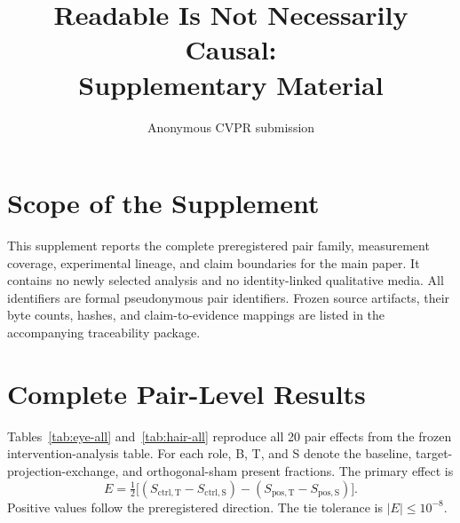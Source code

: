\documentclass[10pt,twocolumn,letterpaper]{article}
\title{Readable Is Not Necessarily Causal:\\Supplementary Material}
\author{Anonymous CVPR submission}
\begin{document}
\maketitle

\section{Scope of the Supplement}

This supplement reports the complete preregistered pair family, measurement
coverage, experimental lineage, and claim boundaries for the main paper.  It
contains no newly selected analysis and no identity-linked qualitative media.
All identifiers are formal pseudonymous pair identifiers.  Frozen source
artifacts, their byte counts, hashes, and claim-to-evidence mappings are listed
in the accompanying traceability package.

\section{Complete Pair-Level Results}

Tables~\ref{tab:eye-all} and~\ref{tab:hair-all} reproduce all 20 pair effects
from the frozen intervention-analysis table.  For each role, B, T, and S denote
the baseline, target-projection-exchange, and orthogonal-sham present fractions.
The primary effect is
\begin{equation}
 E=\tfrac{1}{2}\big[(S_{\mathrm{ctrl,T}}-S_{\mathrm{ctrl,S}})
 -(S_{\mathrm{pos,T}}-S_{\mathrm{pos,S}})\big].
\end{equation}
Positive values follow the preregistered direction.  The tie tolerance is
$|E|\le 10^{-8}$.
\end{document}
